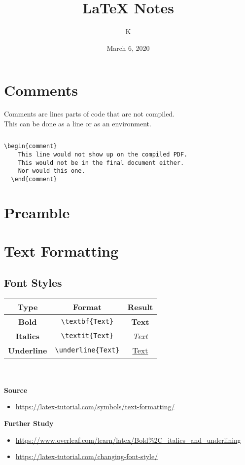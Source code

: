 \documentclass[10pt, letterpaper]{article}
\title{LaTeX Notes}
\author{K}
\date{March 6, 2020}
\begin{document}
\maketitle
\tableofcontents{}
\pagebreak

\section{Comments}
Comments are lines parts of code that are not compiled.\\
This can be done as a line or as an environment.

\lstset{style=basicstyle}
\begin{lstlisting}[title=Comment by Line]
  % This line would not show up on the compiled PDF.
\end{lstlisting}

\begin{lstlisting}[title=Comment by environment]
  \begin{comment}
    This line would not show up on the compiled PDF.
    This would not be in the final document either.
    Nor would this one.
  \end{comment}
\end{lstlisting}

\section{Preamble}

\section{Text Formatting}
\subsection{Font Styles}
\begin{tabular}{c c c}
  Type & Format & Result\\
  \hline
  \textbf{Bold} & \verb|\textbf{Text}| & \textbf{Text}\\
  \textbf{Italics} & \verb|\textit{Text}| & \textit{Text}\\
  \textbf{Underline} & \verb|\underline{Text}| & \underline{Text}
\end{tabular}\\
\\
\textbf{Source}
\begin{itemize}
  \item \url{https://latex-tutorial.com/symbols/text-formatting/}
\end{itemize}
\textbf{Further Study}
\begin{itemize}
  \item \url{https://www.overleaf.com/learn/latex/Bold%2C_italics_and_underlining}
  \item \url{https://latex-tutorial.com/changing-font-style/}
\end{itemize}
\end{document}
